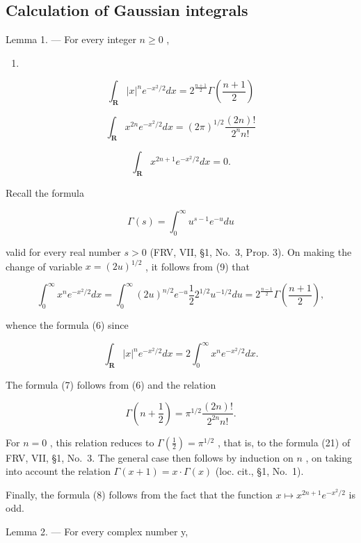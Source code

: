 \subsection{Calculation of Gaussian integrals}

Lemma 1. --- For every integer \(n \geqslant 0\) ,

\begin{enumerate}
\def\labelenumi{(\arabic{enumi})}
\setcounter{enumi}{5}
\tightlist
\item
\end{enumerate}

\[
\int_ {\mathbf {R}} | x | ^ {n} e ^ {- x ^ {2} / 2} d x = 2 ^ {\frac {n + 1}{2}} \Gamma \left(\frac {n + 1}{2}\right)\tag{7}
\]

\[
\int_ {\mathbf {R}} x ^ {2 n} e ^ {- x ^ {2} / 2} d x = (2 \pi) ^ {1 / 2} \frac {(2 n) !}{2 ^ {n} n !}\tag{8}
\]

\[
\int_ {\mathbf {R}} x ^ {2 n + 1} e ^ {- x ^ {2} / 2} d x = 0.
\]

Recall the formula

\[
\Gamma (s) = \int_ {0} ^ {\infty} u ^ {s - 1} e ^ {- u} d u\tag{9}
\]

valid for every real number \(s > 0\) (FRV, VII, §1, No.~3, Prop. 3). On making the change of variable \(x = (2u)^{1/2}\) , it follows from (9) that

\[
\int_ {0} ^ {\infty} x ^ {n} e ^ {- x ^ {2} / 2} d x = \int_ {0} ^ {\infty} (2 u) ^ {n / 2} e ^ {- u} \frac {1}{2} 2 ^ {1 / 2} u ^ {- 1 / 2} d u = 2 ^ {\frac {n - 1}{2}} \Gamma \left(\frac {n + 1}{2}\right),
\]

whence the formula (6) since

\[
\int_ {\mathbf {R}} | x | ^ {n} e ^ {- x ^ {2} / 2} d x = 2 \int_ {0} ^ {\infty} x ^ {n} e ^ {- x ^ {2} / 2} d x.
\]

The formula (7) follows from (6) and the relation

\[
\Gamma \left(n + \frac {1}{2}\right) = \pi^ {1 / 2} \frac {(2 n) !}{2 ^ {2 n} n !}.\tag{10}
\]

For \(n = 0\) , this relation reduces to \(\Gamma(\frac{1}{2}) = \pi^{1/2}\) , that is, to the formula (21) of FRV, VII, §1, No.~3. The general case then follows by induction on \(n\) , on taking into account the relation \(\Gamma(x + 1) = x \cdot \Gamma(x)\) (loc. cit., §1, No.~1).

Finally, the formula (8) follows from the fact that the function \(x \mapsto x^{2n+1}e^{-x^2/2}\) is odd.

Lemma 2. --- For every complex number y,

